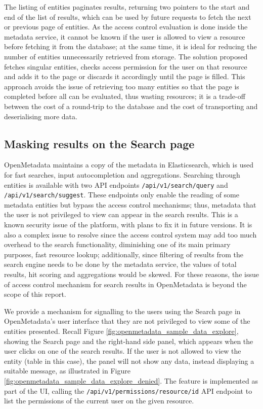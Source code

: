 The listing of entities paginates results, returning two pointers to the start and end of the list of results, which can be used by future requests to fetch the next or previous page of entities. As the access control evaluation is done inside the metadata service, it cannot be known if the user is allowed to view a resource before fetching it from the database; at the same time, it is ideal for reducing the number of entities unnecessarily retrieved from storage. The solution proposed fetches singular entities, checks access permission for the user on that resource and adds it to the page or discards it accordingly until the page is filled. This approach avoids the issue of retrieving too many entities so that the page is completed before all can be evaluated, thus wasting resources; it is a trade-off between the cost of a round-trip to the database and the cost of transporting and deserialising more data. 

\subsection{Masking results on the Search page}

OpenMetadata maintains a copy of the metadata in Elasticsearch, which is used for fast searches, input autocompletion and aggregations. Searching through entities is available with two API endpoints  \texttt{/api/v1/search/query} and \texttt{/api/v1/search/suggest}. These endpoints only enable the reading of some metadata entities but bypass the access control mechanisms; thus, metadata that the user is not privileged to view can appear in the search results. This is a known security issue of the platform, with plans to fix it in future versions. It is also a complex issue to resolve since the access control system may add too much overhead to the search functionality, diminishing one of its main primary purposes, fast resource lookup; additionally, since filtering of results from the search engine needs to be done by the metadata service, the values of total results, hit scoring and aggregations would be skewed. For these reasons, the issue of access control mechanism for search results in OpenMetadata is beyond the scope of this report.

We provide a mechanism for signalling to the users using the Search page in OpenMetadata's user interface that they are not privileged to view some of the entities presented. Recall Figure \ref{fig:openmetadata_sample_data_explore}, showing the Search page and the right-hand side panel, which appears when the user clicks on one of the search results. If the user is not allowed to view the entity (table in this case), the panel will not show any data, instead displaying a suitable message, as illustrated in Figure \ref{fig:openmetadata_sample_data_explore_denied}. The feature is implemented as part of the UI, calling the \texttt{/api/v1/permissions/{resource}/{id}} API endpoint to list the permissions of the current user on the given resource.

